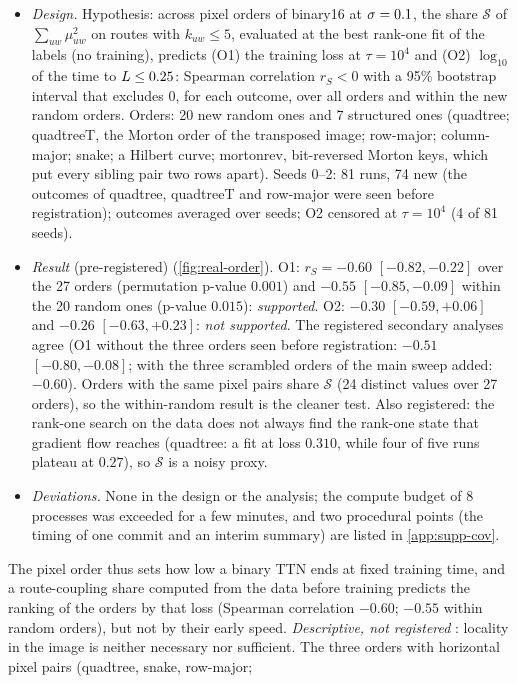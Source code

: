 \begin{itemize}
  \item \emph{Design.} Hypothesis: across pixel orders of binary16 at $\sigma=0.1$, the share $\mathcal S$ of
    $\sum_{uw}\mu_{uw}^2$ on routes with $k_{uw}\le5$, evaluated at the best rank-one fit of the labels (no
    training), predicts (O1) the training loss at $\tau=10^4$ and (O2) $\log_{10}$ of the time to
    $L\le0.25$: Spearman correlation $r_S<0$ with a 95\% bootstrap interval that excludes 0, for each
    outcome, over all orders and within the new random orders. Orders: 20 new random ones and 7 structured
    ones (quadtree; quadtreeT, the Morton order of the transposed image; row-major; column-major; snake; a
    Hilbert curve; mortonrev, bit-reversed Morton keys, which put every sibling pair two rows apart).
    Seeds 0--2: 81 runs, 74 new (the outcomes of quadtree, quadtreeT and row-major were seen before
    registration); outcomes averaged over seeds; O2 censored at $\tau=10^4$ (4 of 81 seeds).
  \item \emph{Result} \empirical{} (pre-registered) \newresult{} (\cref{fig:real-order}). O1:
    $r_S=-0.60$ $[-0.82,-0.22]$ over the 27 orders (permutation p-value $0.001$) and $-0.55$ $[-0.85,-0.09]$
    within the 20 random ones (p-value $0.015$): \emph{supported}. O2: $-0.30$ $[-0.59,+0.06]$ and $-0.26$
    $[-0.63,+0.23]$: \emph{not supported}. The registered secondary analyses agree (O1 without the three orders
    seen before registration: $-0.51$ $[-0.80,-0.08]$; with the three scrambled orders of the main sweep
    added: $-0.60$). Orders with the same pixel pairs share $\mathcal S$ (24 distinct values over 27 orders), so the
    within-random result is the cleaner test. Also registered: the rank-one search on the data does not
    always find the rank-one state that gradient flow reaches (quadtree: a fit at loss $0.310$, while four of
    five runs plateau at $0.27$), so $\mathcal S$ is a noisy proxy.
  \item \emph{Deviations.} None in the design or the analysis; the compute budget of 8 processes was exceeded
    for a few minutes, and two procedural points (the timing of one commit and an interim summary) are
    listed in \cref{app:supp-cov}.
\end{itemize}
The pixel order thus sets how low a binary TTN ends at fixed training time, and a route-coupling share
computed from the data before training predicts the ranking of the orders by that loss (Spearman
correlation $-0.60$; $-0.55$ within random orders), but not by their early speed. \emph{Descriptive, not
registered} \empirical: locality in the image is neither necessary nor sufficient. The three orders with horizontal pixel pairs (quadtree, snake, row-major;
